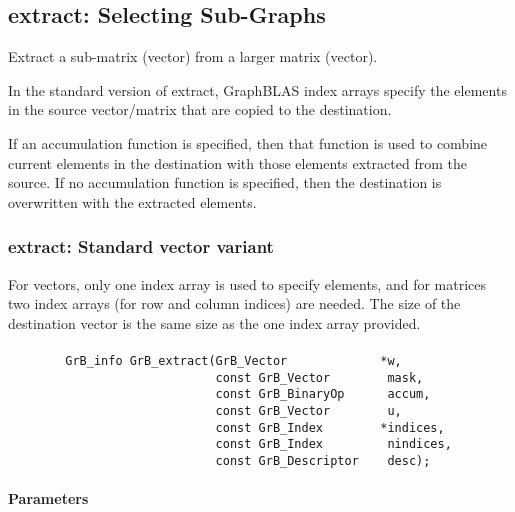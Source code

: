 \subsection{{\sf extract}: Selecting Sub-Graphs}
\label{Sec:extract}

Extract a sub-matrix (vector) from a larger matrix (vector). 

In the standard version of {\sf extract}, GraphBLAS index arrays
specify the elements in the source vector/matrix that are copied to
the destination. 

If an accumulation function is specified, then that function is
used to combine current elements in the destination with those elements
extracted from the source. If no accumulation function is specified, then
the destination is overwritten with the extracted elements.  


\subsubsection{{\sf extract}: Standard vector variant}

For vectors, only one index array is used to specify
elements, and for matrices two index arrays (for row and column indices)
are needed.  The size of the destination vector is the same size as
the one index array provided.  

\paragraph{\syntax}

\begin{verbatim}
        GrB_info GrB_extract(GrB_Vector             *w,
                             const GrB_Vector        mask,
                             const GrB_BinaryOp      accum,
                             const GrB_Vector        u,
                             const GrB_Index        *indices,
                             const GrB_Index         nindices,
                             const GrB_Descriptor    desc);
\end{verbatim}

\paragraph{Parameters}

